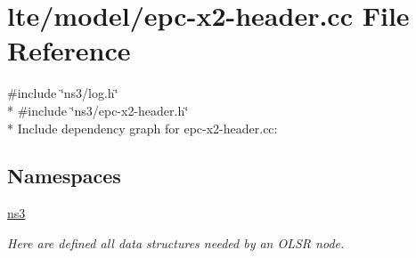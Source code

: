 \hypertarget{epc-x2-header_8cc}{}\section{lte/model/epc-\/x2-\/header.cc File Reference}
\label{epc-x2-header_8cc}
{\ttfamily \#include \char`\"{}ns3/log.\+h\char`\"{}}\\*
{\ttfamily \#include \char`\"{}ns3/epc-\/x2-\/header.\+h\char`\"{}}\\*
Include dependency graph for epc-\/x2-\/header.cc\+:
\subsection*{Namespaces}
\begin{DoxyCompactItemize}
\item 
 \hyperlink{namespacens3}{ns3}
\begin{DoxyCompactList}\small\item\em Here are defined all data structures needed by an O\+L\+SR node. \end{DoxyCompactList}\end{DoxyCompactItemize}
